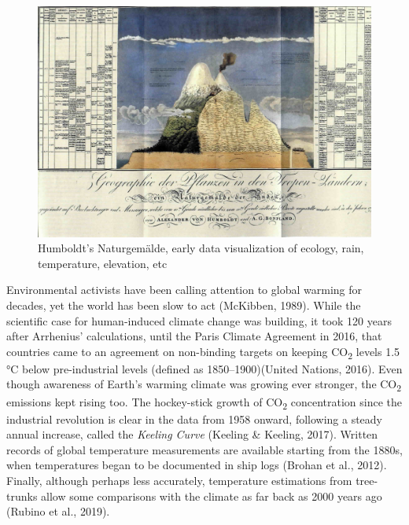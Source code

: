 \documentclass[
  letterpaper,
  DIV=11,
  numbers=noendperiod]{scrartcl}
\begin{document}
\begin{figure}[H]

{\centering \includegraphics[width=1\textwidth,height=\textheight]{./images/sustainability/humboldt.jpg}

}

\caption{Humboldt's Naturgemälde, early data visualization of ecology,
rain, temperature, elevation, etc}

\end{figure}%

Environmental activists have been calling attention to global warming
for decades, yet the world has been slow to act (McKibben, 1989). While
the scientific case for human-induced climate change was building, it
took 120 years after Arrhenius' calculations, until the Paris Climate
Agreement in 2016, that countries came to an agreement on non-binding
targets on keeping CO\textsubscript{2} levels 1.5 °C below
pre-industrial levels (defined as 1850--1900)(United Nations, 2016).
Even though awareness of Earth's warming climate was growing ever
stronger, the CO\textsubscript{2} emissions kept rising too. The
hockey-stick growth of CO\textsubscript{2} concentration since the
industrial revolution is clear in the data from 1958 onward, following a
steady annual increase, called the \emph{Keeling Curve} (Keeling \&
Keeling, 2017). Written records of global temperature measurements are
available starting from the 1880s, when temperatures began to be
documented in ship logs (Brohan et al., 2012). Finally, although perhaps
less accurately, temperature estimations from tree-trunks allow some
comparisons with the climate as far back as 2000 years ago (Rubino et
al., 2019).
\end{document}
